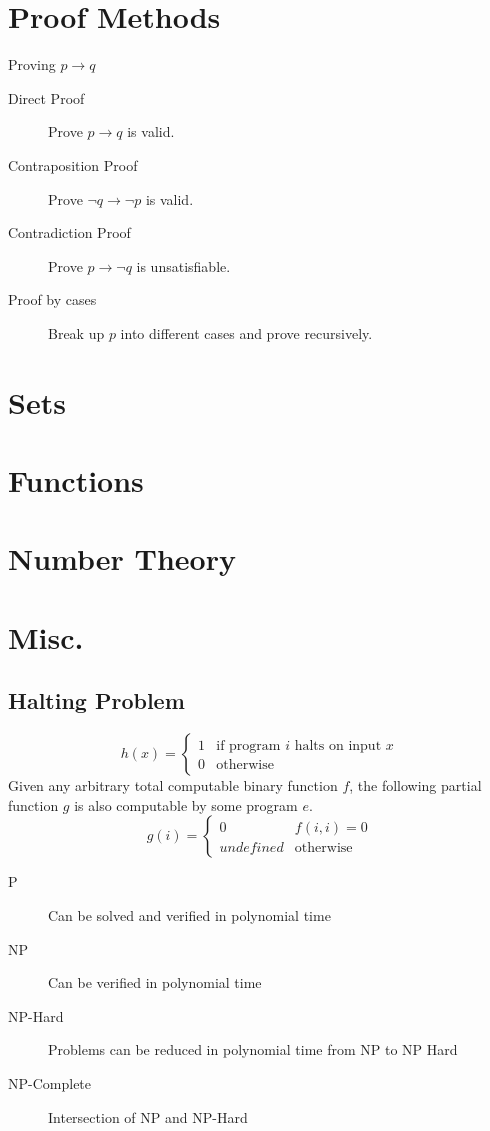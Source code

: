 \documentclass[a4paper]{article}
\begin{document}
\section{Proof Methods}
Proving $p \to q$
\begin{description}
    \item[Direct Proof] Prove $p \to q$ is valid.
    \item[Contraposition Proof] Prove $\neg q \to \neg p$ is valid.
    \item[Contradiction Proof] Prove $p \to \neg q$ is unsatisfiable.
    \item[Proof by cases] Break up $p$ into different cases and prove recursively.
\end{description}

\section{Sets}

\section{Functions}

\section{Number Theory}

\section{Misc.}
\subsection{Halting Problem}
\begin{displaymath}
    h(x) = \left\{
        \begin{array}{lr}
            1 & \text{if program $i$ halts on input $x$}\\
            0 & \text{otherwise}
        \end{array}
    \right.
\end{displaymath}
Given any arbitrary total computable binary function $f$, the following partial function $g$ is also computable by some program $e$.
\begin{displaymath}
    g(i) = \left\{
        \begin{array}{lr}
            0 & f(i, i) = 0\\
            undefined & \text{otherwise}
        \end{array}
    \right.
\end{displaymath}
\begin{description}
    \item[P] Can be solved and verified in polynomial time
    \item[NP] Can be verified in polynomial time
    \item[NP-Hard] Problems can be reduced in polynomial time from NP to NP Hard
    \item[NP-Complete] Intersection of NP and NP-Hard
\end{description}
\end{document}
